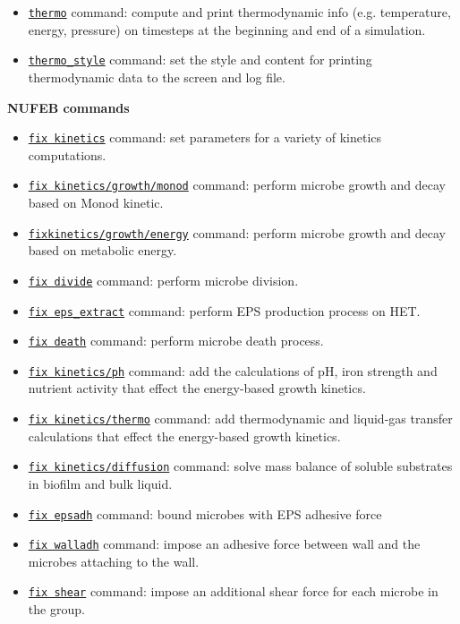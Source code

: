 \documentclass[11pt,a4paper,openright]{article}
\begin{document}
\begin{itemize} [nosep]
    \item \href{http://lammps.sandia.gov/doc/thermo.html}{\tt thermo} command: compute and print thermodynamic info (e.g. temperature, energy, pressure) on timesteps at the beginning and end of a simulation. 
    \item \href{http://lammps.sandia.gov/doc/thermo_style.html}{\tt thermo\_style} command: set the style and content for printing thermodynamic data to the screen and log file.
    \\
\end{itemize} 

\noindent\textbf{NUFEB commands}\\
\begin{itemize} [nosep]
    \item \hyperref[fkinetics]{\tt fix kinetics} command: set parameters for a variety of kinetics computations.
    \item \hyperref[fkineticsmonod]{\tt fix kinetics/growth/monod} command: perform microbe growth and decay based on Monod kinetic.
    \item \hyperref[fkineticsenergy]{\tt fixkinetics/growth/energy} command: perform microbe growth and decay based on metabolic energy.
    \item \hyperref[divide]{\tt fix divide} command: perform microbe division.
    \item \hyperref[epsextract]{\tt fix eps\_extract} command: perform EPS production process on HET.
    \item \hyperref[death]{\tt fix death} command: perform microbe death process.
    \item \hyperref[fkineticsph]{\tt fix kinetics/ph} command: add the calculations of pH, iron strength and nutrient activity that effect the energy-based growth kinetics.
    \item \hyperref[fkineticsthermo]{\tt fix kinetics/thermo} command: add thermodynamic and liquid-gas transfer calculations that effect the energy-based growth kinetics.
    \item \hyperref[fkineticsdiffusion]{\tt fix kinetics/diffusion} command: solve mass balance of soluble substrates in biofilm and bulk liquid.	
    \item \hyperref[epsadh]{\tt fix epsadh} command: bound microbes with EPS adhesive force
    \item \hyperref[walladh]{\tt fix walladh} command: impose an adhesive force between wall and the microbes attaching to the wall.
    \item \hyperref[shear]{\tt fix shear} command: impose an additional shear force for each microbe in the group.  

\end{itemize}
\end{document}
